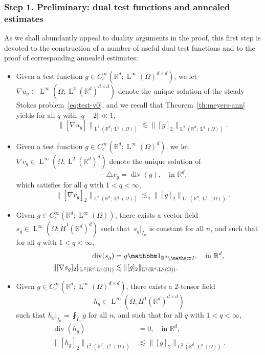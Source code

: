 \documentclass[10pt]{amsart}
\let\mathcal\mathscr
\let\mathds\mathbbm
\theoremstyle{plain}
\theoremstyle{definition}
\newcommand{\R}{\mathbb R}
\newcommand{\Ic}{\mathcal I}
\newcommand{\Ld}{\operatorname{L}}
\newcommand{\Div}{{\operatorname{div}}}
\newcommand{\step}[1]{\subsubsection*{Step #1}}
\begin{document}
\step{1. Preliminary: dual test functions and annealed estimates}
As we shall abundantly appeal to duality arguments in the proof, this first step is devoted to the construction of a number of useful dual test functions and to the proof of corresponding annealed estimates:
\begin{itemize}
\item Given a test function $g\in C^\infty_c(\R^d;\Ld^\infty(\Omega)^{d\times d})$, we let $\nabla u_g\in \Ld^\infty(\Omega;\Ld^2(\R^d)^{d\times d})$ denote the unique solution of the steady Stokes problem~\eqref{eq:test-v0}, and we recall that
Theorem~\ref{th:meyers-ann} yields for all $q$ with $|q-2|\ll1$,
\begin{equation}\label{eq:test-V+}
\quad\|[\nabla u_g]\|_{\Ld^2(\R^d;\Ld^q(\Omega))}\lesssim \|[g]_2\|_{\Ld^2(\R^d;\Ld^q(\Omega))}.
\end{equation}
\item Given a test function $g\in C^\infty_c(\R^d;\Ld^\infty(\Omega)^{d})$, we let $\nabla v_g\in \Ld^\infty(\Omega;\Ld^2(\R^d)^{d})$ denote the unique solution of
\begin{equation}\label{eq:test-W}
\quad-\triangle v_g=\Div (g),\quad\text{in $\R^d$},
\end{equation}
which satisfies for all $q$ with $1<q<\infty$,
\begin{equation}\label{eq:test-W+}
\quad\|[\nabla v_g]_2\|_{\Ld^2(\R^d;\Ld^q(\Omega))}\lesssim_q \|[g]_2\|_{\Ld^2(\R^d;\Ld^q(\Omega))}.
\end{equation}
\item Given $g\in C^\infty_c(\R^d;\Ld^\infty(\Omega))$, there exists a vector field $s_g\in\Ld^\infty(\Omega;\dot H^1(\R^d)^d)$ such that~$s_g|_{I_n}$ is constant for all $n$, and such that for all $q$ with $1<q<\infty$,
\begin{equation}\label{eq:test-R}
\begin{aligned}
\quad\Div (s_g)&= g\mathds1_{\R^d\setminus\Ic},\quad\text{in $\R^d$},\\
\|[\nabla s_g]_2\|_{\Ld^2(\R^d;\Ld^q(\Omega))}&\lesssim \|[g]_2\|_{\Ld^2(\R^d;\Ld^q(\Omega))}.
\end{aligned}
\end{equation}
\item Given $g\in C^\infty_c(\R^d;\Ld^\infty(\Omega)^{d\times d})$, there exists a $2$-tensor field
\[
h_g\in\Ld^\infty(\Omega;H^1(\R^d)^{d\times d})
\]
such that $h_g|_{I_n}=\fint_{I_n}g$ for all $n$, and such that for all $q$ with $1<q<\infty$,
\begin{equation}\label{eq:test-H}
\begin{aligned}
\Div (h_g)&=0,\quad\text{in $\R^d$},\\
\|[ h_g]_2\|_{\Ld^2(\R^d;\Ld^q(\Omega))}&\lesssim \|[g]_2\|_{\Ld^2(\R^d;\Ld^q(\Omega))}.
\end{aligned}
\end{equation}
\end{itemize}
\end{document}
